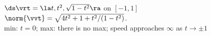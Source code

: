 {$\ds \vrt = \la t,t^2,\sqrt{1-t^2}\ra$ on $[-1,1]$
}
{
$\norm{\vvt} = \sqrt{4t^2+1+t^2/(1-t^2)}$. \\
min: $t=0$; max: there is no max; speed approaches $\infty$ as $t\to\pm 1$
}